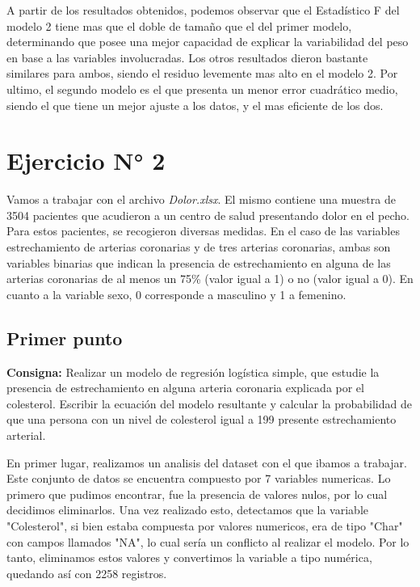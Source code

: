 \documentclass{article} %
\begin{document}
A partir de los resultados obtenidos, podemos observar que el Estadístico F del modelo 2 tiene mas que el doble de tamaño que el del primer modelo, determinando que posee una mejor capacidad de explicar la variabilidad del peso en base a las variables involucradas. Los otros resultados dieron bastante similares para ambos, siendo el residuo levemente mas alto en el modelo 2. Por ultimo, el segundo modelo es el que presenta un menor error cuadrático medio, siendo el que tiene un mejor ajuste a los datos, y el mas eficiente de los dos.

\section{Ejercicio N° 2}

Vamos a trabajar con el archivo \textit{Dolor.xlsx}. El mismo contiene una muestra de 3504 pacientes que acudieron a un centro de salud presentando dolor en el pecho. Para estos pacientes, se recogieron diversas medidas. En el caso de las variables estrechamiento de arterias coronarias y de tres arterias coronarias, ambas son variables binarias que indican la presencia de estrechamiento en alguna de las arterias coronarias de al menos un 75\% (valor igual a 1) o no (valor igual a 0). En cuanto a la variable sexo, 0 corresponde a masculino y 1 a femenino.

\subsection{Primer punto}

\textbf{Consigna:} Realizar un modelo de regresión logística simple, que estudie la presencia de estrechamiento en alguna arteria coronaria explicada por el colesterol. Escribir la ecuación del modelo resultante y calcular la probabilidad de que una persona con un nivel de colesterol igual a 199 presente estrechamiento arterial.

En primer lugar, realizamos un analisis del dataset con el que ibamos a trabajar. Este conjunto de datos se encuentra compuesto por 7 variables numericas. Lo primero que pudimos encontrar, fue la presencia de valores nulos, por lo cual decidimos eliminarlos. Una vez realizado esto, detectamos que la variable "Colesterol", si bien estaba compuesta por valores numericos, era de tipo "Char" con campos llamados "NA", lo cual sería un conflicto al realizar el modelo. Por lo tanto, eliminamos estos valores y convertimos la variable a tipo numérica, quedando así con 2258 registros. 
\end{document}
